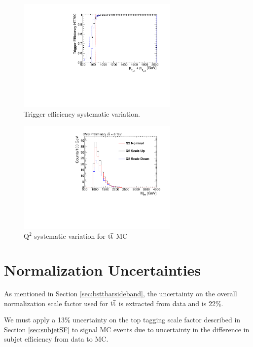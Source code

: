 \begin{figure}[htcb]
\begin{center}
\includegraphics[width=0.7\textwidth]{AN-14-049/figs/Trigger_Comparison_Htdijet_dataonly_withsyst}
\caption{
Trigger efficiency systematic variation. 
}
\label{figs:bsteffsys}
\end{center}
\end{figure}


\begin{figure}[htcb]
\begin{center}
\includegraphics[width=0.7\textwidth]{AN-14-049/figs/TTbar_Q2Scale}
\caption{
$\mathrm{Q^2}$ systematic variation for $\mathrm{t\overline{t}}$ MC 
}
\label{figs:bsq2scale}
\end{center}
\end{figure}


\section{Normalization Uncertainties}
As mentioned in Section \ref{sec:bsttbarsideband}, the uncertainty on the overall normalization scale factor used for $\mathrm{t\overline{t}}$ is extracted from data and is 22\%.   

We must apply a 13\% uncertainty on the top tagging scale factor described in Section \ref{sec:subjetSF} 
to signal MC events due to uncertainty in the difference in subjet efficiency from data to MC.

